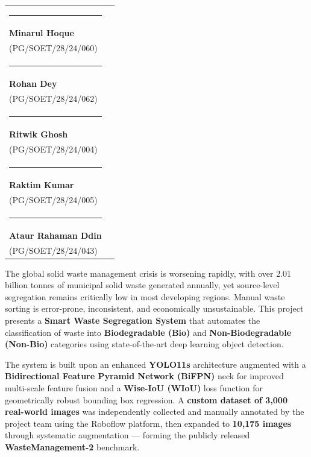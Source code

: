 \documentclass[BTech]{audiss}
\begin{document}
\begin{center}
\begin{tabular}{p{7cm} p{7cm}}
\centering \rule{6cm}{0.4pt} \\[-0.3em]
\centering \textbf{Minarul Hoque} \\ (PG/SOET/28/24/060) \\[2em]
\centering \rule{6cm}{0.4pt} \\[-0.3em]
\centering \textbf{Rohan Dey} \\ (PG/SOET/28/24/062) \\[2em]
\centering \rule{6cm}{0.4pt} \\[-0.3em]
\centering \textbf{Ritwik Ghosh} \\ (PG/SOET/28/24/004) \\[2em]
\centering \rule{6cm}{0.4pt} \\[-0.3em]
\centering \textbf{Raktim Kumar} \\ (PG/SOET/28/24/005) \\[2em]
\centering \rule{6cm}{0.4pt} \\[-0.3em]
\centering \textbf{Ataur Rahaman Ddin} \\ (PG/SOET/28/24/043) \\[2em]
\end{tabular}
\end{center}

\pagebreak

\abstract
\vspace*{24pt}

\noindent
The global solid waste management crisis is worsening rapidly, with over 2.01 billion tonnes of municipal solid waste generated annually, yet source-level segregation remains critically low in most developing regions. Manual waste sorting is error-prone, inconsistent, and economically unsustainable. This project presents a \textbf{Smart Waste Segregation System} that automates the classification of waste into \textbf{Biodegradable (Bio)} and \textbf{Non-Biodegradable (Non-Bio)} categories using state-of-the-art deep learning object detection.

The system is built upon an enhanced \textbf{YOLO11s} architecture augmented with a \textbf{Bidirectional Feature Pyramid Network (BiFPN)} neck for improved multi-scale feature fusion and a \textbf{Wise-IoU (WIoU)} loss function for geometrically robust bounding box regression. A \textbf{custom dataset of 3,000 real-world images} was independently collected and manually annotated by the project team using the Roboflow platform, then expanded to \textbf{10,175 images} through systematic augmentation --- forming the publicly released \textbf{WasteManagement-2} benchmark.
\end{document}
